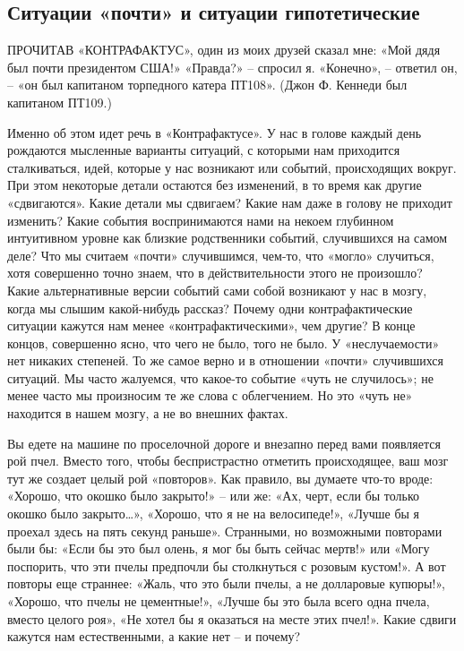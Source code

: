 \documentclass[../main.tex]{subfiles}
\begin{document}

\subsection{Ситуации «почти» и ситуации гипотетические}

ПРОЧИТАВ «КОНТРАФАКТУС», один из моих друзей сказал мне: «Мой дядя был почти президентом США!» «Правда?» \--- спросил я. «Конечно», \--- ответил он, \--- «он был капитаном торпедного катера ПТ108». (Джон Ф. Кеннеди был капитаном ПТ109.)

Именно об этом идет речь в «Контрафактусе». У нас в голове каждый день рождаются мысленные варианты ситуаций, с которыми нам приходится сталкиваться, идей, которые у нас возникают или событий, происходящих вокруг. При этом некоторые детали остаются без изменений, в то время как другие «сдвигаются». Какие детали мы сдвигаем? Какие нам даже в голову не приходит изменить? Какие события воспринимаются нами на некоем глубинном интуитивном уровне как близкие родственники событий, случившихся на самом деле? Что мы считаем «почти» случившимся, чем-то, что «могло» случиться, хотя совершенно точно знаем, что в действительности этого не произошло? Какие альтернативные версии событий сами собой возникают у нас в мозгу, когда мы слышим какой-нибудь рассказ? Почему одни контрафактические ситуации кажутся нам менее «контрафактическими», чем другие? В конце концов, совершенно ясно, что чего не было, того не было. У «неслучаемости» нет никаких степеней. То же самое верно и в отношении «почти» случившихся ситуаций. Мы часто жалуемся, что какое-то событие «чуть не случилось»; не менее часто мы произносим те же слова с облегчением. Но это «чуть не» находится в нашем мозгу, а не во внешних фактах.

Вы едете на машине по проселочной дороге и внезапно перед вами появляется рой пчел. Вместо того, чтобы беспристрастно отметить происходящее, ваш мозг тут же создает целый рой «повторов». Как правило, вы думаете что-то вроде: «Хорошо, что окошко было закрыто!» \--- или же: «Ах, черт, если бы только окошко было закрыто\ldots», «Хорошо, что я не на велосипеде!», «Лучше бы я проехал здесь на пять секунд раньше». Странными, но возможными повторами были бы: «Если бы это был олень, я мог бы быть сейчас мертв!» или «Могу поспорить, что эти пчелы предпочли бы столкнуться с розовым кустом!». А вот повторы еще страннее: «Жаль, что это были пчелы, а не долларовые купюры!», «Хорошо, что пчелы не цементные!», «Лучше бы это была всего одна пчела, вместо целого роя», «Не хотел бы я оказаться на месте этих пчел!». Какие сдвиги кажутся нам естественными, а какие нет \--- и почему?
\end{document}
